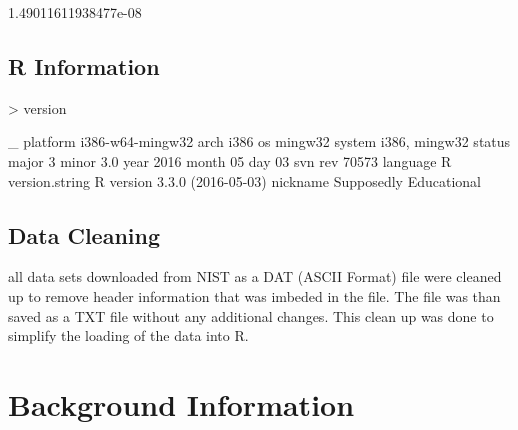 \documentclass[10pt]{article}
\begin{document}
\begin{Schunk}
\begin{Soutput}
[1] 1.49011611938477e-08
\end{Soutput}
\end{Schunk}
\subsection{R Information}
\begin{Schunk}
\begin{Sinput}
> version
\end{Sinput}
\begin{Soutput}
               _                           
platform       i386-w64-mingw32            
arch           i386                        
os             mingw32                     
system         i386, mingw32               
status                                     
major          3                           
minor          3.0                         
year           2016                        
month          05                          
day            03                          
svn rev        70573                       
language       R                           
version.string R version 3.3.0 (2016-05-03)
nickname       Supposedly Educational      
\end{Soutput}
\end{Schunk}
\subsection{Data Cleaning}
all data sets downloaded from NIST as a DAT (ASCII Format) file were cleaned up 
to remove header information that was imbeded in the file. The file was than saved
as a TXT file without any additional changes. This clean up was done to simplify 
the loading of the data into R.

\section{Background Information}
\end{document}
